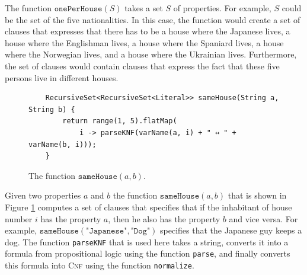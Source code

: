 The function $\texttt{onePerHouse}(S)$ takes a set $S$ of properties.  For
example, $S$ could be the set of the five nationalities.
In this case, the function would create a set of clauses that expresses that
there has to be a house where the Japanese lives, a house where the Englishman
lives, a house where the Spaniard lives, a house where the Norwegian lives, and
a house where the Ukrainian lives.  Furthermore, the set of clauses would contain
clauses that express the fact that these five persons live in different houses.


\begin{figure}[!ht]
\centering
\begin{verbatim}
    RecursiveSet<RecursiveSet<Literal>> sameHouse(String a, String b) {
        return range(1, 5).flatMap(
            i -> parseKNF(varName(a, i) + " ↔ " + varName(b, i)));
    }
\end{verbatim}
\vspace*{-0.3cm}
\caption{The function $\texttt{sameHouse}(a, b)$.}
\label{fig:sameHouse}
\end{figure}

Given two properties $a$ and $b$ the function $\texttt{sameHouse}(a, b)$ that is
shown in Figure \ref{fig:sameHouse} computes
a set of clauses that specifies that if the inhabitant of house number $i$ has
the property $a$, then he also has the property $b$ and vice versa.  For
example, $\texttt{sameHouse}(\texttt{"Japanese"}, \texttt{"Dog"})$ specifies
that the Japanese guy keeps a dog.  The function \texttt{parseKNF} that is used here takes a string, converts
it into a formula from propositional logic using the function \texttt{parse}, and finally converts this formula
into \textsc{Cnf} using the function \texttt{normalize}.

